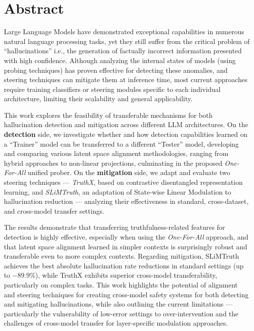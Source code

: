 \chapter*{\Large \center Abstract}

Large Language Models have demonstrated exceptional capabilities in numerous natural language processing tasks, yet they still suffer from the critical problem of ``hallucinations'' i.e., the generation of factually incorrect information presented with high confidence. Although analyzing the internal states of models (using probing techniques) has proven effective for detecting these anomalies, and steering techniques can mitigate them at inference time, most current approaches require training classifiers or steering modules specific to each individual architecture, limiting their scalability and general applicability.


This work explores the feasibility of transferable mechanisms for both hallucination detection and mitigation across different LLM architectures. On the \textbf{detection} side, we investigate whether and how detection capabilities learned on a ``Trainer'' model can be transferred to a different ``Tester'' model, developing and comparing various latent space alignment methodologies, ranging from hybrid approaches to non-linear projections, culminating in the proposed \textit{One-For-All} unified prober. On the \textbf{mitigation} side, we adapt and evaluate two steering techniques --- \textit{TruthX}, based on contrastive disentangled representation learning, and \textit{SLiMTruth}, an adaptation of State-wise Linear Modulation to hallucination reduction --- analyzing their effectiveness in standard, cross-dataset, and cross-model transfer settings.

The results demonstrate that transferring truthfulness-related features for detection is highly effective, especially when using the \textit{One-For-All} approach, and that latent space alignment learned in simpler contexts is surprisingly robust and transferable even to more complex contexts. Regarding mitigation, SLiMTruth achieves the best absolute hallucination rate reductions in standard settings (up to $-89.9\%$), while TruthX exhibits superior cross-model transferability, particularly on complex tasks.
This work highlights the potential of alignment and steering techniques for creating cross-model safety systems for both detecting and mitigating hallucinations, while also outlining the current limitations --- particularly the vulnerability of low-error settings to over-intervention and the challenges of cross-model transfer for layer-specific modulation approaches.
